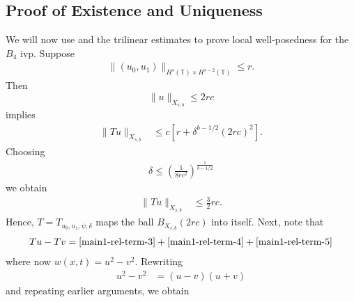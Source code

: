 \documentclass[12pt,reqno]{amsart}
\numberwithin{equation}{section}  %
\renewcommand{\cref}{\Cref}
\newcommand{\ci}{\mathbb{T}}
\begin{document}
\subsection{Proof of Existence and Uniqueness}
\label{sec:proof-b4-per-case}
%
%
%
%				 
%
We will now use \cref{prop:contraction} and the trilinear estimates
to prove local well-posedness for the 
$B_4$ ivp. Suppose
%
\begin{equation*}
	\begin{split}
    \|(u_0, u_{1})\|_{H^s(\ci) \times H^{s-2}(\ci)} \le r.
  \end{split}
\end{equation*}
%
Then $$\|u\|_{X_{s,b}} \le 2rc$$ implies
%
\begin{equation*}
	\begin{split}
		\|Tu \|_{X_{s,b}} 
    & \le c \left[ r + \delta^{b - 1/2} \left( 
		2rc \right)^2 \right].
	\end{split}
\end{equation*}
%
Choosing 
%
%
\begin{equation}
  \label{delta-suf-small}
\begin{split}
  \delta \le \left (\frac{1}{8rc^{2}} \right )^{\frac{1}{b - 1/2}}
\end{split}
\end{equation}
%
%
we obtain 
%
%
%
\begin{equation*}
\begin{split}
\|Tu \|_{X_{s,b}} 
    & \le \frac{3}{2}rc.
  \end{split}
\end{equation*}
%
%
Hence, $T=T_{u_0, u_1, \psi, \delta}$ maps the ball $B_{X_{s,b}}(2rc)$ into
itself. Next, note that 
%
\begin{equation*}
	\begin{split}
    Tu - Tv = \cref{main1-rel-term-3} + \cref{main1-rel-term-4} +
    \cref{main1-rel-term-5} 
  \end{split}
  \label{eqn:integral-form-dif}
\end{equation*}
%
where now $w(x,t) =u^{2} - v^{2}$. Rewriting
%
\begin{equation*}
	\begin{split}
	u^2 - v^2
		& = (u-v)(u+v)
		\end{split}
\end{equation*}
%
and repeating earlier arguments, we obtain
\end{document}
